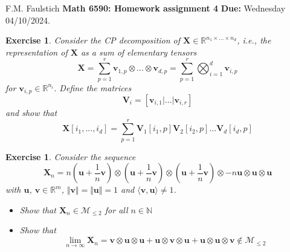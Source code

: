 \documentclass[11pt]{article}
\newcommand{\bvec}[1]{\mathbf{#1}}
\newcommand{\vu}{\bvec{u}}
\newcommand{\vv}{\bvec{v}}
\newcommand{\vV}{\bvec{V}}
\newcommand{\vX}{\bvec{X}}
\newtheorem{exercise}[theorem]{Exercise}
\begin{document}
\begin{flushleft}
F.M. Faulstich \hfill {\large\bf Math 6590: Homework assignment 4} \hfill {\bf Due:} Wednesday 04/10/2024.\\
\end{flushleft}


\begin{exercise}
Consider the CP decomposition of $\vX \in \mathbb{R}^{n_1 \times ... \times n_d}$, i.e., the representation of $\vX$ as a sum of elementary tensors
$$
\vX
=
\sum_{p=1}^r
\vv_{1,p} \otimes ... \otimes \vv_{d,p}
=
\sum_{p=1}^r \bigotimes_{i=1}^d \vv_{i,p}
$$
for $\vv_{i,p} \in \mathbb{R}^{n_i}$. Define the matrices
\begin{equation}
\vV_i 
=
[
\vv_{i,1}|...|\vv_{i,r}
]
\end{equation}
and show that 
\begin{equation}
\vX [i_1,...,i_d]
=
\sum_{p=1}^r
\vV_1[i_1,p] \vV_2[i_2,p] ... \vV_d[i_d,p]
\end{equation}

\end{exercise}


\begin{exercise}
Consider the sequence
$$
\vX_n
=n
\left(
\vu + \frac{1}{n} \vv
\right)
\otimes 
\left(
\vu + \frac{1}{n} \vv
\right)
\otimes 
\left(
\vu + \frac{1}{n} \vv
\right)
\otimes 
-
n \vu \otimes \vu \otimes \vu 
$$
with $\vu$, $\vv \in\mathbb{R}^m$, $\Vert \vv \Vert = \Vert \vu \Vert =1$ and $\langle \vv, \vu \rangle \neq 1$.\\
\begin{itemize}
\item[i)] Show that 
 $\vX_n \in \mathcal{M}_{\leq 2}$ for all $n\in\mathbb{N}$
\item[ii)] Show that 
$$
\lim_{n\to \infty} \vX_n 
=
\vv \otimes \vu \otimes \vu +
\vu \otimes \vv \otimes \vu +
\vu \otimes \vu \otimes \vv
\notin \mathcal{M}_{\leq 2}
$$
\end{itemize}
\end{exercise}
\end{document}
